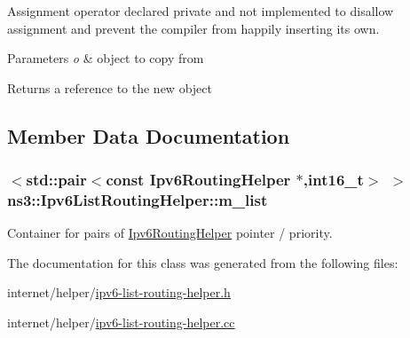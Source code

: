Assignment operator declared private and not implemented to disallow assignment and prevent the compiler from happily inserting its own. 


\begin{DoxyParams}{Parameters}
{\em o} & object to copy from \\
\hline
\end{DoxyParams}
\begin{DoxyReturn}{Returns}
a reference to the new object 
\end{DoxyReturn}


\subsection{Member Data Documentation}
\subsubsection[{\texorpdfstring{m\+\_\+list}{m_list}}]{$<$std\+::pair$<$const {\bf Ipv6\+Routing\+Helper} $\ast$,int16\+\_\+t$>$ $>$ ns3\+::\+Ipv6\+List\+Routing\+Helper\+::m\+\_\+list\hspace{0.3cm}{\ttfamily [private]}}\hypertarget{classns3_1_1Ipv6ListRoutingHelper_aebbcb820adbd54879726bae01c18b8e3}{}\label{classns3_1_1Ipv6ListRoutingHelper_aebbcb820adbd54879726bae01c18b8e3}


Container for pairs of \hyperlink{classns3_1_1Ipv6RoutingHelper}{Ipv6\+Routing\+Helper} pointer / priority. 



The documentation for this class was generated from the following files\+:\begin{DoxyCompactItemize}
\item 
internet/helper/\hyperlink{ipv6-list-routing-helper_8h}{ipv6-\/list-\/routing-\/helper.\+h}\item 
internet/helper/\hyperlink{ipv6-list-routing-helper_8cc}{ipv6-\/list-\/routing-\/helper.\+cc}\end{DoxyCompactItemize}
